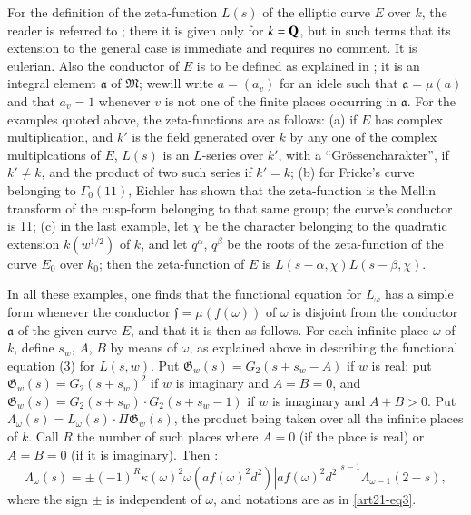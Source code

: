 For the definition of the zeta-function $L(s)$ of the elliptic curve $E$ over $k$, the reader is referred to \cite{art21-key2}; there it is given only for $k=\mathbf{Q}$, but in such terms that its extension to the general case is immediate and requires no comment. It is eulerian. Also the conductor of $E$ is to be defined as explained in \cite{art21-key2}; it is an integral element $\mathfrak{a}$ of $\mathfrak{M}$; we\pageoriginale will write $a=(a_{v})$ for an idele such that $\mathfrak{a}=\mu(a)$ and that $a_{v}=1$ whenever $v$ is not one of the finite places occurring in $\mathfrak{a}$. For the examples quoted above, the zeta-functions are as follows: (a) if $E$ has complex multiplication, and $k'$ is the field generated over $k$ by any one of the complex multiplcations of $E$, $L(s)$ is an $L$-series over $k'$, with a ``Gr\"ossencharakter'', if $k'\neq k$, and the product of two such series if $k'=k$; (b) for Fricke's curve belonging to $\Gamma_{0}(11)$, Eichler has shown that the zeta-function is the Mellin transform of the cusp-form belonging to that same group; the curve's conductor is 11; (c) in the last example, let $\chi$ be the character belonging to the quadratic extension $k(w^{1/2})$ of $k$, and let $q^{\alpha}$, $q^{\beta}$ be the roots of the zeta-function of the curve $E_{0}$ over $k_{0}$; then the zeta-function of $E$ is $L(s-\alpha,\chi)L(s-\beta,\chi)$.

In all these examples, one finds that the functional equation for $L_{\omega}$ has a simple form whenever the conductor $\mathfrak{f}=\mu(f(\omega))$ of $\omega$ is disjoint from the conductor $\mathfrak{a}$ of the given curve $E$, and that it is then as follows. For each infinite place $\omega$ of $k$, define $s_{w}$, $A$, $B$ by means of $\omega$, as explained above in describing the functional equation (3) for $L(s,w)$. Put $\mathfrak{G}_{w}(s)=G_{2}(s+s_{w}-A)$ if $w$ is real; put $\mathfrak{G}_{w}(s)=G_{2}(s+s_{w})^{2}$ if $w$ is imaginary and $A=B=0$, and $\mathfrak{G}_{w}(s)=G_{2}(s+s_{w})\cdot G_{2}(s+s_{w}-1)$ if $w$ is imaginary and $A+B>0$. Put $\Lambda_{\omega}(s)=L_{\omega}(s)\cdot \Pi\mathfrak{G}_{w}(s)$, the product being taken over all the infinite places of $k$. Call $R$ the number of such places where $A=0$ (if the place is real) or $A=B=0$ (if it is imaginary). Then :
\begin{equation*}
\Lambda_{\omega}(s)=\pm (-1)^{R}\kappa(\omega)^{2}\omega(af(\omega)^{2}d^{2})|af(\omega)^{2}d^{2}|^{s-1}\Lambda_{\omega-1}(2-s),\tag{5}\label{art21-eq5}
\end{equation*}
where the sign $\pm$ is independent of $\omega$, and notations are as in \eqref{art21-eq3}.

